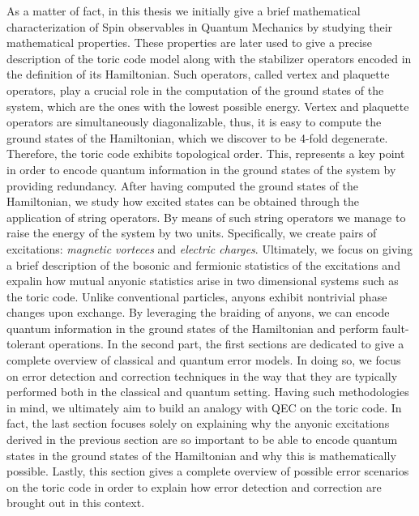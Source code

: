\documentclass{Configuration_Files/PoliMi3i_thesis}
\begin{document}
As a matter of fact, in this thesis we initially give a brief mathematical characterization
of Spin observables in Quantum Mechanics by studying their mathematical properties. 
These properties are later used to give a precise description of the toric code model along with the stabilizer operators encoded in the definition of its Hamiltonian. Such operators, called vertex and plaquette operators, play a crucial role in the computation of the ground states of the system, which are the ones with the lowest possible energy.
Vertex and plaquette operators are simultaneously diagonalizable, thus, it is easy to compute the ground states of the Hamiltonian, which we discover to be 4-fold degenerate. 
Therefore, the toric code exhibits topological order. This, represents a key point in order to encode quantum information in the ground states of the system by providing redundancy. After having computed the ground states of the Hamiltonian, we study how excited states can be obtained through the application of string operators. By means of such string operators we manage to raise the energy of the system by two units. Specifically, we create pairs of excitations: {\it magnetic vorteces} and {\it electric charges}. Ultimately, we focus on giving a brief description of the bosonic and fermionic statistics of the excitations and expalin how mutual anyonic statistics arise in two dimensional systems such as the toric code. Unlike conventional particles, anyons exhibit nontrivial phase changes upon exchange. By leveraging the braiding of anyons, we can encode quantum information in the ground states of the Hamiltonian and perform fault-tolerant operations. \newline
In the second part, the first sections are dedicated to give a complete overview of 
classical and quantum error models. In doing so, we focus on error detection and correction
techniques in the way that they are typically performed both in the classical and quantum setting. Having such methodologies in mind, we ultimately aim to build an analogy with QEC on the toric code. In fact, the last section focuses solely on explaining why the anyonic excitations derived in the previous section are so important to be able to encode quantum states in the ground states of the Hamiltonian and why this is mathematically possible. Lastly, this section gives a complete overview of possible error scenarios on the toric code in order to explain 
how error detection and correction are brought out in this context. \newline
\end{document}
